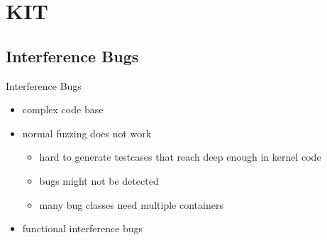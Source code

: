 \section{KIT}
\subsection{Interference Bugs}
\begin{frame}{Interference Bugs}{~}
\begin{minipage}{0.4 \textwidth}
    \begin{itemize}
    \setlength\itemsep{1em}
    \item complex code base
    \item normal fuzzing does not work 
    \begin{itemize}
    \item hard to generate testcases that reach deep enough in kernel code
    \item bugs might not be detected
    \item many bug classes need multiple containers
    \end{itemize}
    \item functional interference bugs 
\end{itemize}
\end{minipage}
\begin{minipage}{0.45\textwidth}
    

\end{minipage}
\end{frame}

